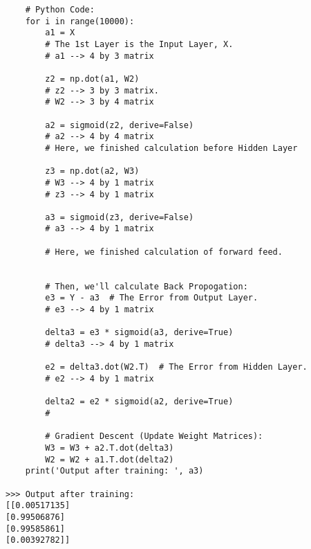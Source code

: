 \documentclass[a4paper,12pt,oneside]{book}
\begin{document}
\begin{lstlisting}
    # Python Code:
    for i in range(10000): 
        a1 = X  
        # The 1st Layer is the Input Layer, X.
        # a1 --> 4 by 3 matrix

        z2 = np.dot(a1, W2)  
        # z2 --> 3 by 3 matrix.
        # W2 --> 3 by 4 matrix

        a2 = sigmoid(z2, derive=False)
        # a2 --> 4 by 4 matrix
        # Here, we finished calculation before Hidden Layer
        
        z3 = np.dot(a2, W3)
        # W3 --> 4 by 1 matrix
        # z3 --> 4 by 1 matrix

        a3 = sigmoid(z3, derive=False)
        # a3 --> 4 by 1 matrix

        # Here, we finished calculation of forward feed.


        # Then, we'll calculate Back Propogation:
        e3 = Y - a3  # The Error from Output Layer.
        # e3 --> 4 by 1 matrix
        
        delta3 = e3 * sigmoid(a3, derive=True)
        # delta3 --> 4 by 1 matrix

        e2 = delta3.dot(W2.T)  # The Error from Hidden Layer.
        # e2 --> 4 by 1 matrix

        delta2 = e2 * sigmoid(a2, derive=True)
        #

        # Gradient Descent (Update Weight Matrices):
        W3 = W3 + a2.T.dot(delta3)
        W2 = W2 + a1.T.dot(delta2)
    print('Output after training: ', a3)

>>> Output after training:  
[[0.00517135]
[0.99506876]
[0.99585861]
[0.00392782]]
\end{lstlisting}
\end{document}
